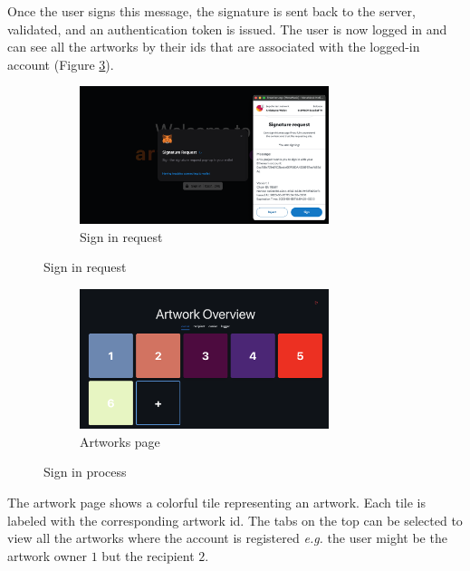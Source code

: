 Once the user signs this message, the signature is sent back to the server, validated, and an authentication token is issued. The user is now logged in and can see all the artworks by their \glspl{id} that are associated with the logged-in account (Figure \ref{fig:artworks_page}).

\begin{figure}[h!]
    \ContinuedFloat
    \begin{subfigure}{\textwidth}
        \centering
        \includegraphics[width=0.8\textwidth]{resources/frontend_screenshots/sign_in.png}
        \caption{Sign in request}
        \label{fig:sign_in}
        \vspace*{2mm}
    \end{subfigure}
\end{figure}

\begin{figure}[h]
    \ContinuedFloat
    \centering
    \begin{subfigure}{\textwidth}
        \centering
        \includegraphics[width=0.8\textwidth]{resources/frontend_screenshots/artworks_page.png}
        \caption{Artworks page}
        \label{fig:artworks_page}
    \end{subfigure}
    \caption{Sign in process}
    \label{fig:sign_in_process}
\end{figure}

The artwork page shows a colorful tile representing an artwork. Each tile is labeled with the corresponding artwork \gls{id}. The tabs on the top can be selected to view all the artworks where the account is registered \textit{e.g.} the user might be the artwork owner $1$ but the recipient $2$. 


